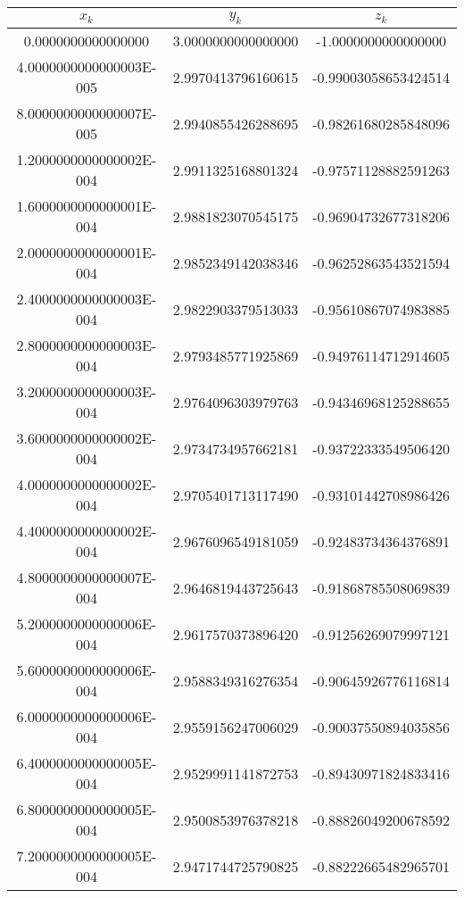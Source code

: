 \documentclass[12pt,a4paper]{article}
\begin{document}
\begin{tabular}{|c|c|c|}
\hline
$ x_k $ & $ y_k $ & $ z_k $ \\
\hline
 0.0000000000000000       &  3.0000000000000000       &  -1.0000000000000000 \\
\hline
 4.0000000000000003E-005  &  2.9970413796160615       & -0.99003058653424514 \\     
\hline
 8.0000000000000007E-005  &  2.9940855426288695       & -0.98261680285848096 \\     
\hline
 1.2000000000000002E-004  &  2.9911325168801324       & -0.97571128882591263 \\     
\hline
 1.6000000000000001E-004  &  2.9881823070545175       & -0.96904732677318206 \\     
\hline
 2.0000000000000001E-004  &  2.9852349142038346       & -0.96252863543521594 \\     
\hline
 2.4000000000000003E-004  &  2.9822903379513033       & -0.95610867074983885 \\     
\hline
 2.8000000000000003E-004  &  2.9793485771925869       & -0.94976114712914605 \\     
\hline
 3.2000000000000003E-004  &  2.9764096303979763       & -0.94346968125288655 \\     
\hline
 3.6000000000000002E-004  &  2.9734734957662181       & -0.93722333549506420 \\     
\hline
 4.0000000000000002E-004  &  2.9705401713117490       & -0.93101442708986426 \\     
\hline
 4.4000000000000002E-004  &  2.9676096549181059       & -0.92483734364376891 \\     
\hline
 4.8000000000000007E-004  &  2.9646819443725643       & -0.91868785508069839 \\     
\hline
 5.2000000000000006E-004  &  2.9617570373896420       & -0.91256269079997121 \\     
\hline
 5.6000000000000006E-004  &  2.9588349316276354       & -0.90645926776116814 \\     
\hline
 6.0000000000000006E-004  &  2.9559156247006029       & -0.90037550894035856 \\     
\hline
 6.4000000000000005E-004  &  2.9529991141872753       & -0.89430971824833416 \\     
\hline
 6.8000000000000005E-004  &  2.9500853976378218       & -0.88826049200678592 \\     
\hline
 7.2000000000000005E-004  &  2.9471744725790825       & -0.88222665482965701 \\     

\end{tabular}
\end{document}

